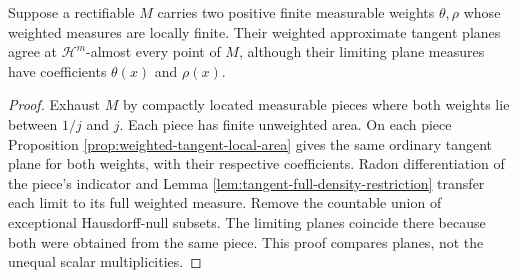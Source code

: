 \begin{corollary}\label{cor:weighted-tangent-independent}
Suppose a rectifiable $M$ carries two positive finite measurable weights $\theta,\rho$ whose weighted measures are locally finite. Their weighted approximate tangent planes agree at $\mathcal H^m$-almost every point of $M$, although their limiting plane measures have coefficients $\theta(x)$ and $\rho(x)$.
\end{corollary}
\begin{proof}
Exhaust $M$ by compactly located measurable pieces where both weights lie between $1/j$ and $j$. Each piece has finite unweighted area. On each piece Proposition \ref{prop:weighted-tangent-local-area} gives the same ordinary tangent plane for both weights, with their respective coefficients. Radon differentiation of the piece's indicator and Lemma \ref{lem:tangent-full-density-restriction} transfer each limit to its full weighted measure. Remove the countable union of exceptional Hausdorff-null subsets. The limiting planes coincide there because both were obtained from the same piece. This proof compares planes, not the unequal scalar multiplicities.
\end{proof}
